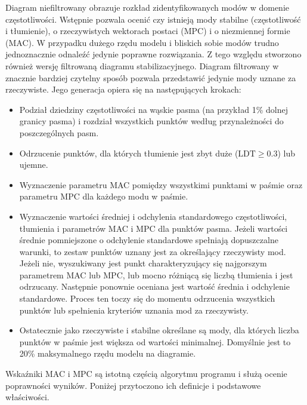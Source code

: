 Diagram niefiltrowany obrazuje rozkład zidentyfikowanych modów w domenie częstotliwości. Wstępnie pozwala ocenić czy istnieją mody stabilne (częstotliwość i tłumienie), o rzeczywistych wektorach postaci (MPC) i o niezmiennej formie (MAC). W przypadku dużego rzędu modelu i bliskich sobie modów trudno jednoznacznie odnaleźć jedynie poprawne rozwiązania. Z tego względu stworzono również wersję filtrowaną diagramu stabilizacyjnego. Diagram filtrowany w znacznie bardziej czytelny sposób pozwala przedstawić jedynie mody uznane za rzeczywiste. Jego generacja opiera się na następujących krokach:
\begin{itemize}
	\item Podział dziedziny częstotliwości na wąskie pasma (na przykład 1\% dolnej granicy pasma) i rozdział wszystkich punktów według przynależności do poszczególnych pasm.
	\item Odrzucenie punktów, dla których tłumienie jest zbyt duże ($\text{LDT}\ge0.3$) lub ujemne.
	\item Wyznaczenie parametru MAC pomiędzy wszystkimi punktami w paśmie oraz parametru MPC dla każdego modu w paśmie.
	\item Wyznaczenie wartości średniej i odchylenia standardowego częstotliwości, tłumienia i parametrów MAC i MPC dla punktów pasma. Jeżeli wartości średnie pomniejszone o odchylenie standardowe spełniają dopuszczalne warunki, to zestaw punktów uznany jest za określający rzeczywisty mod. Jeżeli nie, wyszukiwany jest punkt charakteryzujący się najgorszym parametrem MAC lub MPC, lub mocno różniącą się liczbą tłumienia i jest odrzucany. Następnie ponownie oceniana jest wartość średnia i odchylenie standardowe. Proces ten toczy się do momentu odrzucenia wszystkich punktów lub spełnienia kryteriów uznania mod za rzeczywisty.
	\item Ostatecznie jako rzeczywiste i stabilne określane są mody, dla których liczba punktów w paśmie jest większa od wartości minimalnej. Domyślnie jest to 20\% maksymalnego rzędu modelu na diagramie.
\end{itemize}
Wskaźniki MAC i MPC są istotną częścią algorytmu programu i służą ocenie poprawności wyników. Poniżej przytoczono ich definicje i podstawowe właściwości. 

